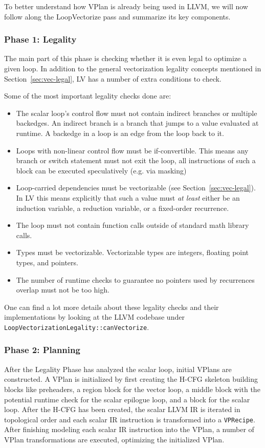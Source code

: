 \documentclass[sigplan,11pt,nonacm]{acmart}
\begin{document}
To better understand how VPlan is already being used in LLVM, we will now follow along the 
LoopVectorize pass and summarize its key components.

\subsubsection{Phase 1: Legality}
The main part of this phase is checking whether it is even legal to optimize a given loop. 
In addition to the general vectorization legality concepts mentioned in 
Section~\ref{sec:vec-legal}, LV has a number of extra conditions to check.

Some of the most important legality checks done are:
\begin{itemize}
  \item The scalar loop's control flow must not contain indirect branches or multiple backedges.
  An indirect branch is a branch that jumps to a value evaluated at runtime. A backedge in a loop 
  is an edge from the loop back to it. 
  \item Loops with non-linear control flow must be if-convertible. This means any branch or switch 
  statement must not exit the loop, all instructions of such a block can be executed speculatively 
  (e.g. via masking)
  \item Loop-carried dependencies must be vectorizable (see Section~\ref{sec:vec-legal}). In LV 
  this means explicitly that such a value must \textit{at least} either be an induction variable, a reduction 
  variable, or a fixed-order recurrence.
  \item The loop must not contain function calls outside of standard math library calls.
  \item Types must be vectorizable. Vectorizable types are integers, floating point types, and 
  pointers.
  \item The number of runtime checks to guarantee no pointers used by recurrences overlap must not be too high.
\end{itemize}

One can find a lot more details about these legality checks and their implementations by looking 
at the LLVM codebase under \texttt{LoopVectorizationLegality::\allowbreak canVectorize}.

\subsubsection{Phase 2: Planning}
After the Legality Phase has analyzed the scalar loop, initial VPlans are constructed.
A VPlan is initialized by first creating the H-CFG skeleton building blocks like preheaders, a 
region block for the vector loop, a middle block with the potential runtime check for the scalar 
epilogue loop, and a block for the scalar loop. After the H-CFG has been created, the scalar LLVM IR 
is iterated in topological order and each scalar IR instruction is transformed into a \texttt{VPRecipe}.
After finishing modeling each scalar IR instruction into the VPlan, a number of VPlan transformations 
are executed, optimizing the initialized VPlan.
\end{document}
